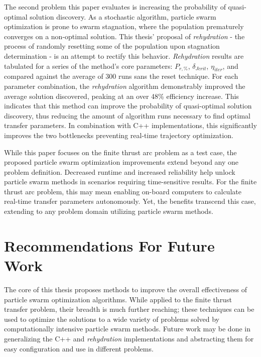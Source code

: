 \noindent The second problem this paper evaluates is increasing the probability of quasi-optimal solution 
discovery. As a stochastic algorithm, particle swarm optimization is prone to swarm stagnation, where the 
population prematurely converges on a non-optimal solution. This thesis' proposal of \textit{rehydration}
- the process of randomly resetting some of the population upon stagnation determination - is an attempt 
to rectify this behavior. \textit{Rehydration} results are tabulated for a series of the method's core parameters: $P_{r,\%}$,
$\delta_{Jcrit}$, $\eta_{iter}$, and compared against the average of 300 runs sans the reset technique. For each 
parameter combination, the \textit{rehydration} algorithm demonstrably improved the average solution discovered, peaking 
at an over 48\% efficiency increase.
This indicates that this method can improve the probability of quasi-optimal solution discovery, thus reducing the 
amount of algorithm runs necessary to find optimal transfer parameters. In combination with C++ implementations, this significantly 
improves the two bottlenecks preventing real-time trajectory optimization. \newline

\noindent While this paper focuses on the finite thrust arc problem as a test case, the proposed particle swarm optimization 
improvements extend beyond any one problem definition. Decreased runtime and increased reliability help
unlock particle swarm methods in scenarios requiring time-sensitive results. For the finite thrust arc problem, this may mean enabling 
on-board computers to calculate real-time transfer parameters autonomously. Yet, the benefits transcend this case,
extending to any problem domain utilizing particle swarm methods. \newline

\section{Recommendations For Future Work}

\noindent The core of this thesis proposes methods to improve the overall effectiveness of particle swarm 
optimization algorithms. While applied to the finite thrust transfer problem, their breadth is much further
reaching; these techniques can be used to optimize the solutions to a
wide variety of problems solved by computationally intensive particle swarm methods. Future work may be done in 
generalizing the C++ and \textit{rehydration} implementations and abstracting them for easy configuration and use 
in different problems. \newline

